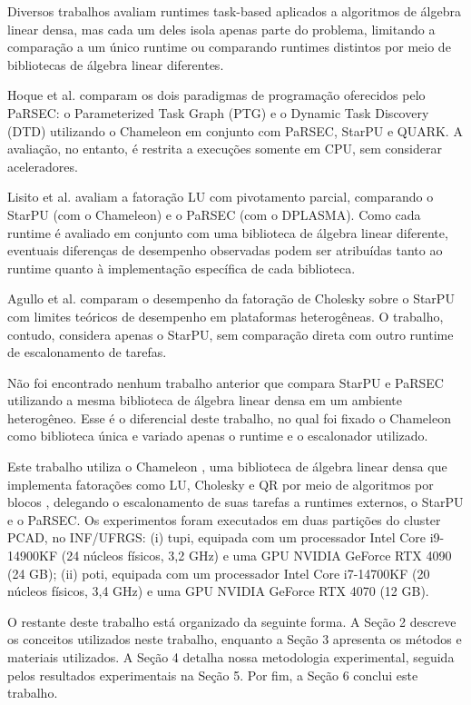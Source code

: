 \documentclass[12pt]{article}
\begin{document}
Diversos trabalhos avaliam runtimes task-based aplicados a algoritmos de álgebra
linear densa, mas cada um deles isola apenas parte do problema, limitando a
comparação a um único runtime ou comparando runtimes distintos por meio de
bibliotecas de álgebra linear diferentes.

Hoque et al. \cite{10.1145/3148226.3148233} comparam os dois paradigmas de
programação oferecidos pelo PaRSEC: o Parameterized Task Graph (PTG) e o Dynamic
Task Discovery (DTD) utilizando o Chameleon em conjunto com PaRSEC, StarPU e
QUARK. A avaliação, no entanto, é restrita a execuções somente em CPU, sem
considerar aceleradores.

Lisito et al. \cite{11078555} avaliam a fatoração LU com pivotamento parcial,
comparando o StarPU (com o Chameleon) e o PaRSEC (com o DPLASMA). Como cada
runtime é avaliado em conjunto com uma biblioteca de álgebra linear diferente,
eventuais diferenças de desempenho observadas podem ser atribuídas tanto ao
runtime quanto à implementação específica de cada biblioteca.

Agullo et al. \cite{7284288} comparam o desempenho da fatoração de Cholesky sobre
o StarPU com limites teóricos de desempenho em plataformas heterogêneas. O
trabalho, contudo, considera apenas o StarPU, sem comparação direta com outro
runtime de escalonamento de tarefas.

Não foi encontrado nenhum trabalho anterior que compara StarPU e PaRSEC
utilizando a mesma biblioteca de álgebra linear densa em um ambiente
heterogêneo. Esse é o diferencial deste trabalho, no qual foi fixado o Chameleon
como biblioteca única e variado apenas o runtime e o escalonador utilizado.

Este trabalho utiliza o Chameleon \cite{AGULLO2012473}, uma biblioteca de álgebra
linear densa que implementa fatorações como LU, Cholesky e QR por meio de
algoritmos por blocos \cite{DBLP}, delegando o escalonamento de suas tarefas a
runtimes externos, o StarPU e o PaRSEC. Os experimentos foram executados em
duas partições do cluster PCAD, no INF/UFRGS: (i) tupi, equipada com um
processador Intel Core i9-14900KF (24 núcleos físicos, 3,2 GHz) e uma GPU NVIDIA
GeForce RTX 4090 (24 GB); (ii) poti, equipada com um processador Intel Core
i7-14700KF (20 núcleos físicos, 3,4 GHz) e uma GPU NVIDIA GeForce RTX 4070 (12
GB).

O restante deste trabalho está organizado da seguinte forma. A Seção 2 descreve
os conceitos utilizados neste trabalho, enquanto a Seção 3 apresenta os métodos
e materiais utilizados. A Seção 4 detalha nossa metodologia experimental,
seguida pelos resultados experimentais na Seção 5. Por fim, a Seção 6 conclui
este trabalho.
\end{document}
